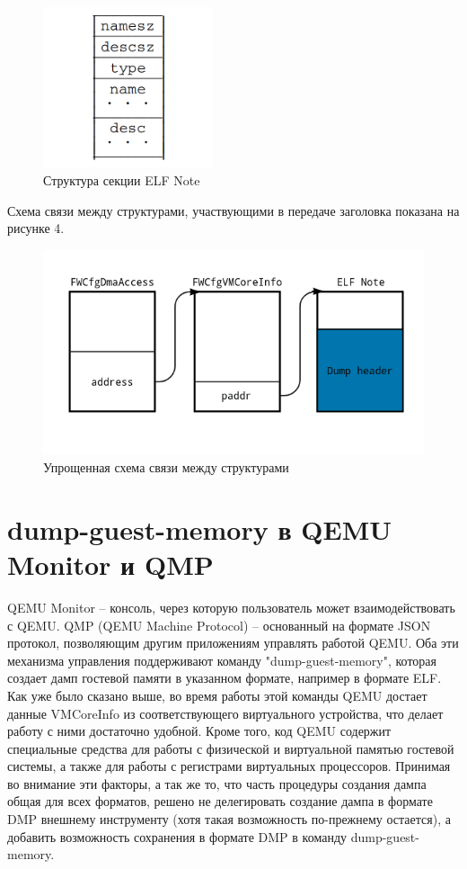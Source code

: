 \documentclass{mipt-thesis-bs}
\begin{document}
\begin{figure}[h]
\begin{center}
    \includegraphics[width=5cm]{note.png}
    \caption{Структура секции ELF Note}
\end{center}
\end{figure}

Схема связи между структурами, участвующими в передаче заголовка показана на рисунке 4.

\begin{figure}[h]
\begin{center}
    \includegraphics[width=1\textwidth]{vmci_scheme1.png}
    \caption{Упрощенная схема связи между структурами}
\end{center}
\end{figure}

\newpage
\section*{dump-guest-memory в QEMU Monitor и QMP}

QEMU Monitor -- консоль, через которую пользователь может взаимодействовать с QEMU. QMP (QEMU Machine Protocol) -- основанный на формате JSON протокол, позволяющим другим приложениям управлять работой QEMU. Оба эти механизма управления поддерживают команду "dump-guest-memory", которая создает дамп гостевой памяти в указанном формате, например в формате ELF. Как уже было сказано выше, во время работы этой команды QEMU достает данные VMCoreInfo из соответствующего виртуального устройства, что делает работу с ними достаточно удобной. Кроме того, код QEMU содержит специальные средства для работы с физической и виртуальной памятью гостевой системы, а также для работы с регистрами виртуальных процессоров. Принимая во внимание эти факторы, а так же то, что часть процедуры создания дампа общая для всех форматов, решено не делегировать создание дампа в формате DMP внешнему инструменту (хотя такая возможность по-прежнему остается), а добавить возможность сохранения в формате DMP в команду dump-guest-memory.
\end{document}
